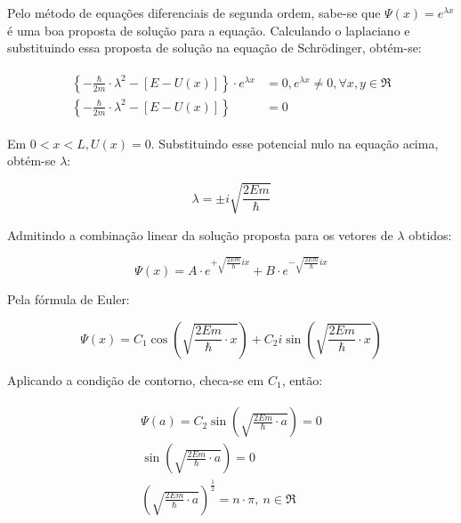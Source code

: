   \par Pelo método de equações diferenciais de segunda ordem, sabe-se que $\Psi(x)=e^{\lambda x}$ é uma boa proposta de solução para a equação. Calculando o laplaciano e substituindo essa proposta de solução na equação de Schrödinger, obtém-se:

  \begin{align}
    \label{schrodinger_6}
        \begin{array}{ll}
          \displaystyle \left\{ -\frac{\hbar}{2m}\cdot \lambda^2 - \left[ E - U(x) \right] \right\} \cdot e^{\lambda x} &= 0, e^{\lambda x} \neq 0, \forall x,y \in \Re\\
          \displaystyle \left\{ -\frac{\hbar}{2m}\cdot \lambda^2 - \left[ E - U(x) \right] \right\} &= 0
        \end{array}
  \end{align}

  \par Em $0<x<L, U(x)=0$. Substituindo esse potencial nulo na equação acima, obtém-se $\lambda$\cite{frustrado7}:

  \begin{equation}
    \label{schrodinger_7}
    \lambda = \pm i\sqrt{\frac{2Em}{\hbar}}
  \end{equation}

  \par Admitindo a combinação linear da solução proposta para os vetores de $\lambda$ obtidos:

  \begin{equation}
    \label{schrodinger_8}
    \Psi(x) = A\cdot e^{+\sqrt{\frac{2Em}{\hbar}}ix} + B\cdot e^{-\sqrt{\frac{2Em}{\hbar}}ix}      
  \end{equation}    

  \par Pela fórmula de Euler:

  \begin{equation}
    \label{schrodinger_9}
    \Psi(x) = C_{1} \cos \left(  \sqrt{\frac{2Em}{\hbar} \cdot x }  \right) + C_{2}i \sin \left( \sqrt{\frac{2Em}{\hbar} \cdot x }  \right)
  \end{equation}

  \par Aplicando a condição de contorno, checa-se em $C_{1}$, então:

  \begin{align}
    \label{schrodinger_10} 
    \begin{array}{ll}
      \Psi(a) = C_{2} \sin \left(  \sqrt{\frac{2Em}{\hbar} \cdot a }  \right) = 0\\
      \sin \left(  \sqrt{\frac{2Em}{\hbar} \cdot a }  \right) = 0\\
      \left(  \sqrt{\frac{2Em}{\hbar} \cdot a }  \right)^{\frac{1}{2}} = n\cdot\pi,\ n\in\Re\\
    \end{array}
  \end{align}

